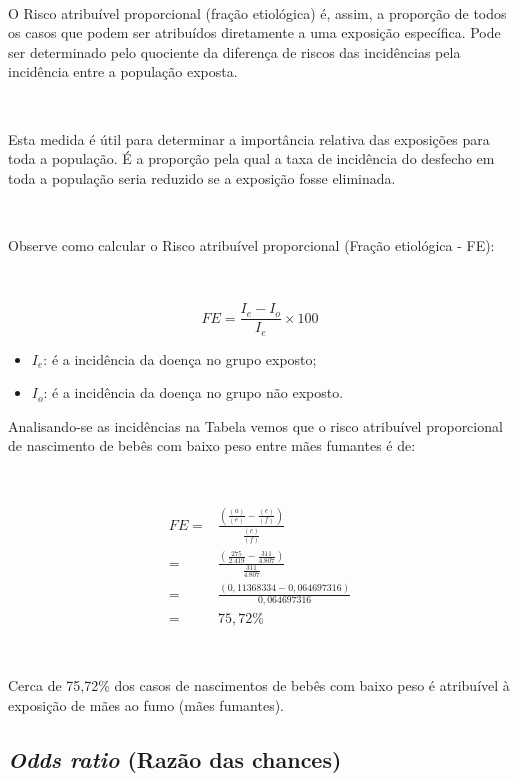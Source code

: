 \documentclass[
]{book}
\providecommand{\tightlist}{%
  \setlength{\itemsep}{0pt}\setlength{\parskip}{0pt}}
\begin{document}
~

O Risco atribuível proporcional (fração etiológica) é, assim, a proporção de todos os casos que podem ser atribuídos diretamente a uma exposição específica. Pode ser determinado pelo quociente da diferença de riscos das incidências pela incidência entre a população exposta.

~

Esta medida é útil para determinar a importância relativa das exposições para toda a população. É a proporção pela qual a taxa de incidência do desfecho em toda a população seria reduzido se a exposição fosse eliminada.

~

Observe como calcular o Risco atribuível proporcional (Fração etiológica - FE):

~

\[
FE = \frac{I_{e}-I_{o}}{I_{e}} \times 100
\]

\hfill\break

\begin{itemize}
\tightlist
\item
  \(I_{e}\): é a incidência da doença no grupo exposto;\\
\item
  \(I_{o}\): é a incidência da doença no grupo não exposto.
\end{itemize}

\hfill\break

Analisando-se as incidências na Tabela vemos que o risco atribuível proporcional de nascimento de bebês com baixo peso entre mães fumantes é de:

~

\begin{align*}
FE = & \frac{\left(\frac{(a)}{(e)} - \frac{(c)}{(f)}\right)}{\frac{(c)}{(f)}}  \\
   = & \frac{\left(\frac{275}{2.419} - \frac{311}{4.807}\right)}{\frac{311}{4.807}} \\ 
   = &  \frac{\left(0,11368334 - 0,064697316\right)}{0,064697316} \\
   = & 75,72 \%
\end{align*}

~

Cerca de 75,72\% dos casos de nascimentos de bebês com baixo peso é atribuível à exposição de mães ao fumo (mães fumantes).

\hypertarget{odds-ratio-razuxe3o-das-chances}{%
\subsection{\texorpdfstring{\emph{Odds ratio} (Razão das chances)}{Odds ratio (Razão das chances)}}\label{odds-ratio-razuxe3o-das-chances}}
\end{document}
